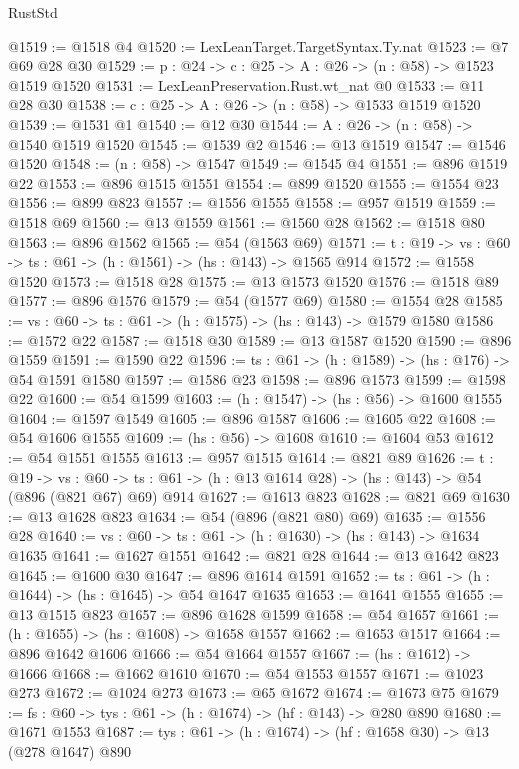\begin{lexlean}{RustStd}
\begin{coremodule}
@1519 := @1518 @4
@1520 := LexLeanTarget.TargetSyntax.Ty.nat
@1523 := @7 @69 @28 @30
@1529 := {p : @24} -> {c : @25} -> {A : @26} -> (n : @58) -> @1523 @1519 @1520
@1531 := LexLeanPreservation.Rust.wt_nat @0
@1533 := @11 @28 @30
@1538 := {c : @25} -> {A : @26} -> (n : @58) -> @1533 @1519 @1520
@1539 := @1531 @1
@1540 := @12 @30
@1544 := {A : @26} -> (n : @58) -> @1540 @1519 @1520
@1545 := @1539 @2
@1546 := @13 @1519
@1547 := @1546 @1520
@1548 := (n : @58) -> @1547
@1549 := @1545 @4
@1551 := @896 @1519 @22
@1553 := @896 @1515 @1551
@1554 := @899 @1520
@1555 := @1554 @23
@1556 := @899 @823
@1557 := @1556 @1555
@1558 := @957 @1519
@1559 := @1518 @69
@1560 := @13 @1559
@1561 := @1560 @28
@1562 := @1518 @80
@1563 := @896 @1562
@1565 := @54 (@1563 @69)
@1571 := {t : @19} -> {vs : @60} -> {ts : @61} -> (h : @1561) -> (hs : @143) -> @1565 @914
@1572 := @1558 @1520
@1573 := @1518 @28
@1575 := @13 @1573 @1520
@1576 := @1518 @89
@1577 := @896 @1576
@1579 := @54 (@1577 @69)
@1580 := @1554 @28
@1585 := {vs : @60} -> {ts : @61} -> (h : @1575) -> (hs : @143) -> @1579 @1580
@1586 := @1572 @22
@1587 := @1518 @30
@1589 := @13 @1587 @1520
@1590 := @896 @1559
@1591 := @1590 @22
@1596 := {ts : @61} -> (h : @1589) -> (hs : @176) -> @54 @1591 @1580
@1597 := @1586 @23
@1598 := @896 @1573
@1599 := @1598 @22
@1600 := @54 @1599
@1603 := (h : @1547) -> (hs : @56) -> @1600 @1555
@1604 := @1597 @1549
@1605 := @896 @1587
@1606 := @1605 @22
@1608 := @54 @1606 @1555
@1609 := (hs : @56) -> @1608
@1610 := @1604 @53
@1612 := @54 @1551 @1555
@1613 := @957 @1515
@1614 := @821 @89
@1626 := {t : @19} ->
  {vs : @60} -> {ts : @61} -> (h : @13 @1614 @28) -> (hs : @143) -> @54 (@896 (@821 @67) @69) @914
@1627 := @1613 @823
@1628 := @821 @69
@1630 := @13 @1628 @823
@1634 := @54 (@896 (@821 @80) @69)
@1635 := @1556 @28
@1640 := {vs : @60} -> {ts : @61} -> (h : @1630) -> (hs : @143) -> @1634 @1635
@1641 := @1627 @1551
@1642 := @821 @28
@1644 := @13 @1642 @823
@1645 := @1600 @30
@1647 := @896 @1614 @1591
@1652 := {ts : @61} -> (h : @1644) -> (hs : @1645) -> @54 @1647 @1635
@1653 := @1641 @1555
@1655 := @13 @1515 @823
@1657 := @896 @1628 @1599
@1658 := @54 @1657
@1661 := (h : @1655) -> (hs : @1608) -> @1658 @1557
@1662 := @1653 @1517
@1664 := @896 @1642 @1606
@1666 := @54 @1664 @1557
@1667 := (hs : @1612) -> @1666
@1668 := @1662 @1610
@1670 := @54 @1553 @1557
@1671 := @1023 @273
@1672 := @1024 @273
@1673 := @65 @1672
@1674 := @1673 @75
@1679 := {fs : @60} -> {tys : @61} -> (h : @1674) -> (hf : @143) -> @280 @890
@1680 := @1671 @1553
@1687 := {tys : @61} -> (h : @1674) -> (hf : @1658 @30) -> @13 (@278 @1647) @890

\end{coremodule}
\end{lexlean}
